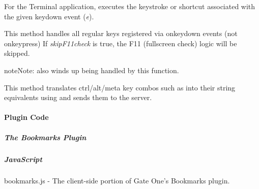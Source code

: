 \documentclass[letterpaper,10pt,openany]{sphinxmanual}
\begin{document}
\begin{fulllineitems}
\begin{fulllineitems}
\label{Applications/terminal/js_terminal_input:GateOne.Terminal.Input.execKeystroke}
For the Terminal application, executes the keystroke or shortcut associated with the given keydown event (\emph{e}).

\end{fulllineitems}



\begin{fulllineitems}
\label{Applications/terminal/js_terminal_input:GateOne.Terminal.Input.emulateKey}
This method handles all regular keys registered via onkeydown events (not onkeypress)
If \emph{skipF11check} is true, the F11 (fullscreen check) logic will be skipped.

\begin{notice}{note}{Note:}
 also winds up being handled by this function.
\end{notice}

\end{fulllineitems}



\begin{fulllineitems}
\label{Applications/terminal/js_terminal_input:GateOne.Terminal.Input.emulateKeyCombo}
This method translates ctrl/alt/meta key combos such as  into their string equivalents using  and sends them to the server.

\end{fulllineitems}


\end{fulllineitems}



\paragraph{Plugin Code}
\label{Applications/terminal/developer:plugin-code}

\subparagraph{The Bookmarks Plugin}
\label{Applications/terminal/plugin_bookmarks:the-bookmarks-plugin}\label{Applications/terminal/plugin_bookmarks::doc}

\subparagraph{JavaScript}
\label{Applications/terminal/plugin_bookmarks:javascript}
bookmarks.js - The client-side portion of Gate One's Bookmarks plugin.
\end{document}
